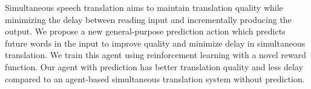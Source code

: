 Simultaneous speech translation aims to maintain translation quality while minimizing the delay between reading input and incrementally producing the output. We propose a new general-purpose prediction action which predicts future words in the input to improve quality and minimize delay in simultaneous translation. We train this agent using reinforcement learning with a novel reward function. Our agent with prediction has better translation quality and less delay compared to an agent-based simultaneous translation system without prediction.
